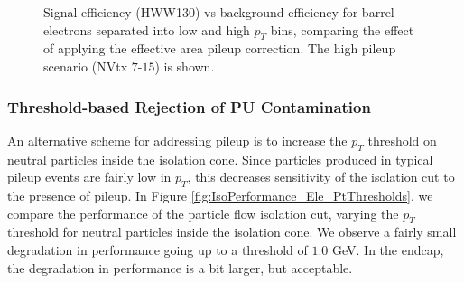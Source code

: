 \begin{figure}[!htbp]
\begin{center}
\caption{Signal efficiency (HWW130) vs background efficiency for barrel electrons separated into 
low and high $p_{T}$ bins, comparing the effect of applying the effective area pileup correction.
The high pileup scenario (NVtx $7$-$15$) is shown.}
\label{fig:IsoPerformance_EleBarrel_EffectiveAreaCorrection}
\end{center}
\end{figure}


\subsubsection{Threshold-based Rejection of PU Contamination}
\label{sec:ThresholdBasedIsolation}
An alternative scheme for addressing pileup is to increase the $p_{T}$ threshold on neutral 
particles inside the isolation cone. Since particles produced in typical pileup events are
fairly low in $p_{T}$, this decreases sensitivity of the isolation cut to the presence of 
pileup. In Figure \ref{fig:IsoPerformance_Ele_PtThresholds}, we compare the performance
of the particle flow isolation cut, varying the $p_{T}$ threshold for neutral particles
inside the isolation cone. We observe a fairly small degradation in performance going up
to a threshold of $1.0$ GeV. In the endcap, the degradation in performance is a bit
larger, but acceptable. 

